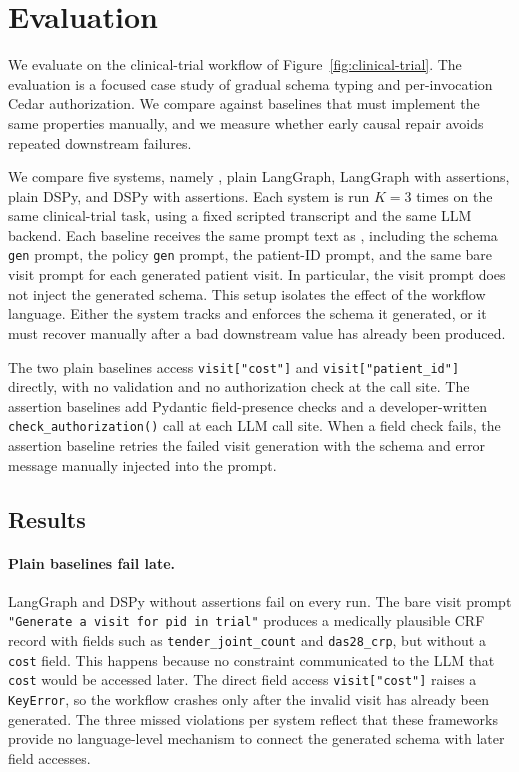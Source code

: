 \section{Evaluation}
\label{sec:evaluation}

We evaluate \pact{} on the clinical-trial workflow of
Figure~\ref{fig:clinical-trial}. The evaluation is a focused case study
of gradual schema typing and per-invocation Cedar authorization. We
compare \pact{} against baselines that must implement the same
properties manually, and we measure whether early causal repair avoids
repeated downstream failures.

We compare five systems, namely \pact{}, plain LangGraph, LangGraph
with assertions, plain DSPy, and DSPy with assertions. Each system is
run $K=3$ times on the same clinical-trial task, using a fixed scripted
transcript and the same LLM backend. Each baseline receives the same
prompt text as \pact{}, including the schema \texttt{gen} prompt, the
policy \texttt{gen} prompt, the patient-ID prompt, and the same bare
visit prompt for each generated patient visit. In particular, the visit
prompt does not inject the generated schema. This setup isolates the
effect of the workflow language. Either the system tracks and enforces
the schema it generated, or it must recover manually after a bad
downstream value has already been produced. 

\begin{sloppypar}
The two plain baselines access \texttt{visit["cost"]} and
\texttt{visit["patient\_id"]} directly, with no validation
and no authorization check at the call site. The assertion baselines add
Pydantic field-presence checks and a developer-written
\texttt{check\_authorization()} call at each LLM call site. When a field
check fails, the assertion baseline retries the failed visit generation
with the schema and error message manually injected into the prompt.
\end{sloppypar}

\subsection{Results}
\label{sec:eval-results}



\paragraph{Plain baselines fail late.}
LangGraph and DSPy without assertions fail on every run. The bare visit
prompt \texttt{"Generate a visit for pid in trial"} produces a medically
plausible CRF record with fields such as
\texttt{tender\_joint\_count} and \texttt{das28\_crp}, but without a
\texttt{cost} field. This happens because no constraint communicated to
the LLM that \texttt{cost} would be accessed later. The direct field
access \texttt{visit["cost"]} raises a \texttt{KeyError}, so the
workflow crashes only after the invalid visit has already been
generated. The three missed violations per system reflect that these
frameworks provide no language-level mechanism to connect the generated
schema with later field accesses.

